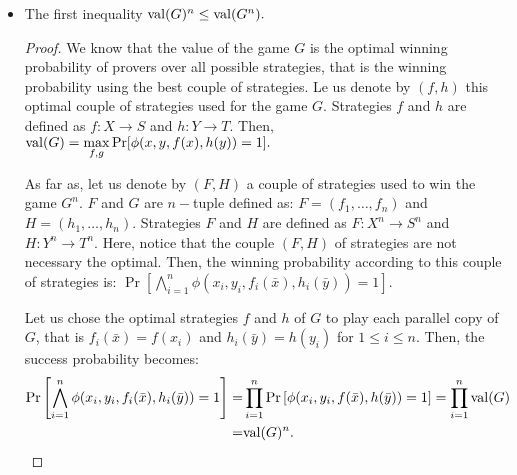 \begin{itemize}
\item The first inequality $\mathrm{val} (G)^n \leq \mathrm{val} (G^n) .$

\begin{proof}
We know that the value of the game $G$ is the optimal winning probability of provers over all possible strategies, that is the winning probability using the best couple of strategies. Le us denote by $(f,h)$ this optimal couple of strategies used for the game $G$. Strategies $f$ and $h$ are  defined as $f: X\longrightarrow S$ and  $h: Y\longrightarrow T.$  Then, $\mathrm{val} (G)= \max\limits_{f,g} \Pr[\phi(x,y,f(x),h(y))=1].$

As far as, let us denote by $(F,H)$ a couple of strategies  used  to win the game $G^n$. $F$ and $G$ are $n-$tuple defined as: $F=(f_1, \ldots, f_n)$ and  $H=(h_1, \ldots, h_n)$. Strategies $F$ and $H$ are  defined as $F: X^n\longrightarrow S^n$ and  $H: Y^n\longrightarrow T^n.$ Here, notice that the couple $(F,H)$ of strategies are not necessary the optimal.
Then, the winning probability according to this couple of strategies is: $\Pr \left[\bigwedge\limits_{i=1}^n \phi (x_i,y_i, f_i(\bar{x}), h_i(\bar{y}))=1 \right].$

%


Let us chose the optimal strategies $f$ and $h$ of $G$ to play each parallel copy of $G$, that is $f_i (\bar{x})=f(x_i)$ and $h_i (\bar{y})=h (y_i)$ for $ 1\leq i \leq n$. Then, the success probability becomes:
\begin{align*}
\Pr \left[\bigwedge\limits_{i=1}^n \phi (x_i,y_i, f_i(\bar{x}), h_i(\bar{y}))=1 \right] = &   \prod\limits_{i=1}^n \Pr \left[ \phi (x_i,y_i, f(\bar{x}), h(\bar{y}))=1 \right] =  \prod\limits_{i=1}^n \mathrm{val} (G) \\
= & \mathrm{val} (G)^n.
\end{align*}


\end{proof}
\end{itemize}
